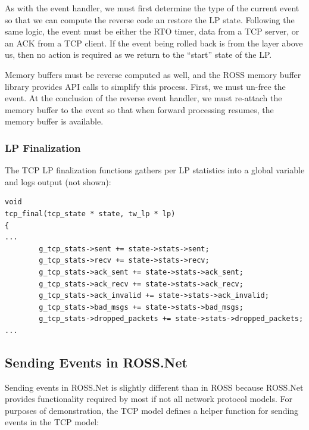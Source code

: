 \documentclass[conference,onecolumn]{IEEEtran}
\begin{document}
As with the event handler, we must first determine the type of the current event so that we can compute the reverse code an restore the LP state.  Following the same logic, the event must be either the RTO timer, data from a TCP server, or an ACK from a TCP client.  If the event being rolled back is from the layer above us, then no action is required as we return to the ``start'' state of the LP.

Memory buffers must be reverse computed as well, and the ROSS memory buffer library provides API calls to simplify this process.  First, we must un-free the event.  At the conclusion of the reverse event handler, we must re-attach the memory buffer to the event so that when forward processing resumes, the memory buffer is available.

\subsubsection{LP Finalization}

The TCP LP finalization functions gathers per LP statistics into a global variable and logs output (not shown):

\begin{small}\begin{verbatim}
void
tcp_final(tcp_state * state, tw_lp * lp)
{
...
        g_tcp_stats->sent += state->stats->sent;
        g_tcp_stats->recv += state->stats->recv;
        g_tcp_stats->ack_sent += state->stats->ack_sent;
        g_tcp_stats->ack_recv += state->stats->ack_recv;
        g_tcp_stats->ack_invalid += state->stats->ack_invalid;
        g_tcp_stats->bad_msgs += state->stats->bad_msgs;
        g_tcp_stats->dropped_packets += state->stats->dropped_packets;
...
\end{verbatim}\end{small}

\subsection{Sending Events in ROSS.Net}

Sending events in ROSS.Net is slightly different than in ROSS because ROSS.Net provides functionality required by most if not all network protocol models.  For purposes of demonstration, the TCP model defines a helper function for sending events in the TCP model:
\end{document}
